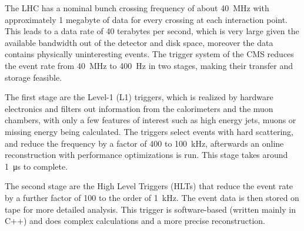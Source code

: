 The LHC has a nominal bunch crossing frequency of about \SI{40}{MHz} with approximately 1 megabyte of data for every crossing at each interaction point. This leads to a data rate of 40 terabytes per second, which is very large given the available bandwidth out of the detector and disk space, moreover the data contains physically uninteresting events. The trigger system of the CMS reduces the event rate from \SI{40}{MHz} to \SI{400}{Hz} in two stages, making their transfer and storage feasible.

The first stage are the Level-1 (L1) triggers, which is realized by hardware electronics and filters out information from the calorimeters and the muon chambers, with only a few features of interest such as high energy jets, muons or missing energy being calculated. The triggers select events with hard scattering, and reduce the frequency by a factor of 400 to \SI{100}{kHz}, afterwards an online reconstruction with performance optimizations is run. This stage takes around \SI{1}{\micro s} to complete.

The second stage are the High Level Triggers (HLTs) that reduce the event rate by a further factor of 100 to the order of \SI{1}{kHz}. The event data is then stored on tape for more detailed analysis. This trigger is software-based (written mainly in C++) and does complex calculations and a more precise reconstruction.